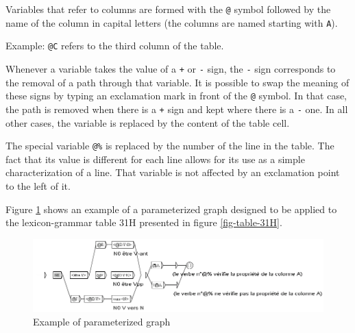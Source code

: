 \bigskip
\noindent Variables that refer to columns are formed with the \verb+@+ symbol
 followed by the name of the column in capital letters (the
columns are named starting with \verb+A+).

\bigskip
\noindent Example: \verb+@C+ refers to the third column of the table.

\bigskip
\noindent Whenever a variable takes the value of a \verb$+$ or \verb+-+ sign, the
\verb+-+ sign corresponds to the removal of a path through that variable. It is
possible to swap the meaning of these signs by typing an exclamation mark in
front of the \verb+@+ symbol. In that case, the path is removed when there is a
\verb$+$ sign and kept where there is a \verb+-+ one. In all other cases, the
variable is replaced by the content of the table cell.

\bigskip
\noindent The special variable \verb+@%+  is replaced by the
number of the line in the table. The fact that its value is different for each
line allows for its use as a simple characterization of a line. That variable is
not affected by an exclamation point to the left of it.

\bigskip
\noindent Figure \ref{fig-reference-graph} shows an example of a parameterized
graph designed to be applied to the lexicon-grammar table 31H presented in figure
\ref{fig-table-31H}.

\begin{figure}[!h]
\begin{center}
\includegraphics[width=15cm]{resources/img/fig8-3.png}
\caption{Example of parameterized graph\label{fig-reference-graph}}
\end{center}
\end{figure}

